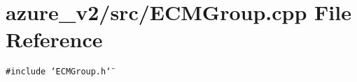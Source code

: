 \section{azure\_\-v2/src/ECMGroup.cpp File Reference}
\label{ECMGroup_8cpp}
{\tt \#include \char`\"{}ECMGroup.h\char`\"{}}\par
